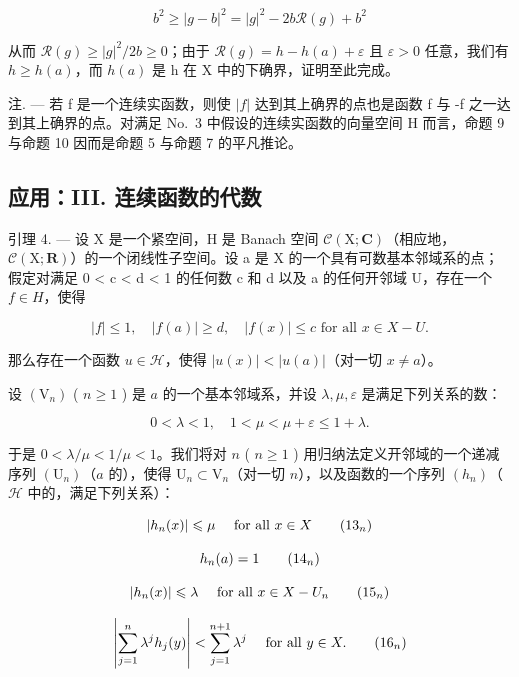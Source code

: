 \[
b ^ {2} \geqslant | g - b | ^ {2} = | g | ^ {2} - 2 b \mathcal {R} (g) + b ^ {2}
\]

从而 \(\mathcal{R}(g) \geqslant |g|^{2}/2b \geqslant 0\)；由于 \(\mathcal{R}(g) = h - h(a) + \varepsilon\) 且 \(\varepsilon > 0\) 任意，我们有 \(h \geqslant h(a)\)，而 \(h(a)\) 是 h 在 X 中的下确界，证明至此完成。

注. --- 若 f 是一个连续实函数，则使 \(|f|\) 达到其上确界的点也是函数 f 与 -f 之一达到其上确界的点。对满足 No.~3 中假设的连续实函数的向量空间 H 而言，命题 9 与命题 10 因而是命题 5 与命题 7 的平凡推论。

\subsection{应用：III. 连续函数的代数}

引理 4. --- 设 X 是一个紧空间，H 是 Banach 空间 \(\mathcal{C}(\mathrm{X};\mathbf{C})\)（相应地，\(\mathcal{C}(\mathrm{X};\mathbf{R})\)）的一个闭线性子空间。设 a 是 X 的一个具有可数基本邻域系的点；假定对满足 0 < c < d < 1 的任何数 c 和 d 以及 a 的任何开邻域 U，存在一个 \(f \in H\)，使得

\[
| f | \leqslant 1, \quad | f (a) | \geqslant d, \quad | f (x) | \leqslant c \text {   for   all   } x \in X - U.\tag{12}
\]

那么存在一个函数 \(u \in \mathcal{H}\)，使得 \(|u(x)| < |u(a)|\)（对一切 \(x \neq a\)）。

设 \(\left(\mathrm{V}_{n}\right)\) ( \(n \geqslant 1\) ) 是 \(a\) 的一个基本邻域系，并设 \(\lambda, \mu, \varepsilon\) 是满足下列关系的数：

\[
0 <   \lambda <   1, \quad 1 <   \mu <   \mu + \varepsilon \leqslant 1 + \lambda .
\]

于是 \(0 < \lambda / \mu < 1 / \mu < 1\)。我们将对 \(n\) ( \(n \geqslant 1\) ) 用归纳法定义开邻域的一个递减序列 \((\mathrm{U}_n)\)（\(a\) 的），使得 \(\mathrm{U}_n \subset \mathrm{V}_n\)（对一切 \(n\)），以及函数的一个序列 \((h_n)\)（\(\mathcal{H}\) 中的，满足下列关系）：

\[
\left| h _ {n} (x) \right| \leqslant \mu \quad \text { for   all } x \in X\tag{\ensuremath{13_n}}
\]

\[
h _ {n} (a) = 1\tag{\ensuremath{14_n}}
\]

\[
\left| h _ {n} (x) \right| \leqslant \lambda \quad \text { for   all } x \in X - U _ {n}\tag{\ensuremath{15_n}}
\]

\[
\left| \sum_ {j = 1} ^ {n} \lambda^ {j} h _ {j} (y) \right| <   \sum_ {j = 1} ^ {n + 1} \lambda^ {j} \quad \text { for   all } y \in X.\tag{\ensuremath{16_n}}
\]

